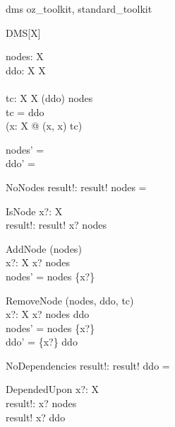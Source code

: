 \zedindent -1mm
\pagestyle{empty}
\raggedbottom


\begin{zsection}
  \SECTION dms \parents oz\_toolkit, standard\_toolkit
\end{zsection}

\begin{class}{DMS}[X]
\also
\begin{state}
  nodes: \finset X  \\
  ddo:  X  \rel  X  \\
  \Delta\\
  tc:  X  \rel  X  
\where
  \dom (ddo) \subseteq nodes \land \\ 
  tc = ddo\plus \land \\ 
  \lnot (\exists x:  X @ (x, x) \in tc)
\end{state}
\begin{init}
  nodes' = \emptyset \\ 
  ddo' = \emptyset
\end{init}
\begin{schema}{NoNodes}
  result!:  \bool 
\where
  result! \iff nodes = \emptyset \\ 
\end{schema}
\begin{schema}{IsNode}
  x?:  X  \\
  result!:  \bool  
\where
  result! \iff x? \in nodes
\end{schema}
\begin{schema}{AddNode}
  \Delta (nodes)\\
  x?:  X  
\where
  x? \notin nodes \\ 
  nodes' = nodes \cup \{x?\}
\end{schema}
\begin{schema}{RemoveNode}
  \Delta (nodes, ddo, tc)\\
  x?:  X  
\where
  x? \in nodes \setminus  \ran ddo \\
  nodes' = nodes \setminus \{x?\} \land \\ 
  ddo' = \{x?\} \ndres ddo
\end{schema}
\begin{schema}{NoDependencies}
  result!:  \bool  
\where
  result! \iff ddo = \emptyset
\end{schema}
\begin{schema}{DependedUpon}
  x?:  X  \\
  result!:  \bool  
\where
  x? \in nodes\\
  result! \iff x? \in  \ran ddo

\end{schema}
\end{class}
